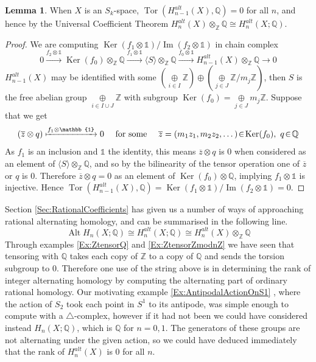 \documentclass[11pt,a4paper,twoside]{article}
\theoremstyle{plain}
\theoremstyle{definition}
\theoremstyle{definition}
\newtheorem{lemma}[thm]{Lemma}
\theoremstyle{definition}
\theoremstyle{definition}
\theoremstyle{definition}
\DeclareMathOperator{\Ima}{Im}
\DeclareMathOperator{\Ker}{Ker}
\DeclareMathOperator{\Tor}{Tor}
\DeclareMathOperator{\Alt}{Alt}
\begin{document}
\vspace{2mm}
\begin{lemma}
\label{Lem:Halt(X;Q)congHalt(X)tensorQ}
When $X$ is an $S_k$-space, $\Tor(H^{alt}_{n\!-\!1}(X),\mathbb{Q})=0$ for all $n$, and hence by the Universal Coefficient Theorem $H^{alt}_n(X)\otimes_\mathbb{Z}\mathbb{Q}\cong H^{alt}_n(X;\mathbb{Q})$.
\end{lemma}
\begin{proof}
We are computing $\Ker(f_1\otimes\mathbb1)/\Ima(f_2\otimes\mathbb{1})$ in chain complex
$$ 0\xrightarrow{f_2\otimes\mathbb1}\Ker(f_0)\otimes_\mathbb{Z}\mathbb{Q}\xrightarrow{f_1\otimes\mathbb1}\langle S\rangle\otimes_\mathbb{Z}\mathbb{Q}\xrightarrow{f_0\otimes\mathbb1}H_{n\!-\!1}^{alt}(X)\otimes_\mathbb{Z}\mathbb{Q}\longrightarrow0$$
$H_{n\!-\!1}^{alt}(X)$ may be identified with some $(\underset{i\in I}\oplus\mathbb{Z})\oplus(\underset{j\in J}\oplus\mathbb{Z}/m_j\mathbb{Z})$, then 
$S$ is the free abelian group $\underset{i\in I\cup J}\oplus\mathbb{Z}$ with subgroup $\Ker(f_0)=\underset{j\in J}\oplus m_j\mathbb{Z}$. Suppose that we get $$(\overline{z}\otimes q) \xmapsto{f_1\otimes\mathbb{1}}0\quad\text{ for some }\quad\overline{z}=(m_1z_1,m_2z_2,\dots)\!\in\!\Ker(f_0),\,\,q\!\in\!\mathbb{Q}$$
As $f_1$ is an inclusion and $\mathbb{1}$ the identity, this means $\overline{z}\otimes q$ is $0$ when considered as an element of $\langle S \rangle\otimes_\mathbb{Z}\mathbb{Q}$, and so by the bilinearity of the tensor operation one of $\overline{z}$ or $q$ is $0$. Therefore $\overline{z}\otimes q=0$ as an element of $\Ker(f_0)\otimes \mathbb{Q}$, implying $f_1\otimes\mathbb{1}$ is injective. Hence $\Tor(H_{n\!-\!1}^{alt}(X),\mathbb{Q})=\Ker(f_1\otimes\mathbb{1})/\Ima(f_2\otimes\mathbb1)=0$.
\end{proof}

Section \ref{Sec:RationalCoefficients} has given us a number of ways of approaching rational alternating homology, and can be summarised in the following line.
$$\Alt H_n(X;\mathbb{Q})\cong  H^{alt}_n(X;\mathbb{Q})\cong H^{alt}_n(X)\otimes_\mathbb{Z}\mathbb{Q}$$
Through examples \ref{Ex:ZtensorQ} and \ref{Ex:ZtensorZmodnZ} we have seen that tensoring with $\mathbb{Q}$ takes each copy of $\mathbb{Z}$ to a copy of $\mathbb{Q}$ and sends the torsion subgroup to $0$. Therefore one use of the string above is in determining the rank of integer alternating homology by computing the alternating part of ordinary rational homology. Our motivating example \ref{Ex:AntipodalActionOnS1} , where the action of $S_2$ took each point in $S^1$ to its antipode, was simple enough to compute with a $\triangle$-complex, however if it had not been we could have considered instead $H_n(X;\mathbb{Q})$, which is $\mathbb{Q}$ for $n\!=\!0,1$. The generators of these groups are not alternating under the given action, so we could have deduced immediately that the rank of $H_n^{alt}(X)$ is $0$ for all $n$.
\end{document}
